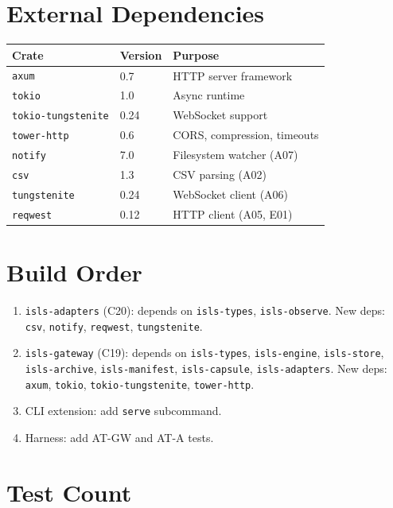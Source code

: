 \documentclass[11pt,a4paper,twoside]{article}
\theoremstyle{definition}
\theoremstyle{plain}
\theoremstyle{remark}
\begin{document}
\section{External Dependencies}

\begin{tabular}{l l l}
\toprule
\textbf{Crate} & \textbf{Version} & \textbf{Purpose} \\
\midrule
\texttt{axum} & 0.7 & HTTP server framework \\
\texttt{tokio} & 1.0 & Async runtime \\
\texttt{tokio-tungstenite} & 0.24 & WebSocket support \\
\texttt{tower-http} & 0.6 & CORS, compression, timeouts \\
\texttt{notify} & 7.0 & Filesystem watcher (A07) \\
\texttt{csv} & 1.3 & CSV parsing (A02) \\
\texttt{tungstenite} & 0.24 & WebSocket client (A06) \\
\texttt{reqwest} & 0.12 & HTTP client (A05, E01) \\
\bottomrule
\end{tabular}

\section{Build Order}

\begin{enumerate}[nosep]
  \item \texttt{isls-adapters} (C20): depends on \texttt{isls-types},
        \texttt{isls-observe}. New deps: \texttt{csv}, \texttt{notify},
        \texttt{reqwest}, \texttt{tungstenite}.
  \item \texttt{isls-gateway} (C19): depends on \texttt{isls-types},
        \texttt{isls-engine}, \texttt{isls-store},
        \texttt{isls-archive}, \texttt{isls-manifest},
        \texttt{isls-capsule}, \texttt{isls-adapters}. New deps:
        \texttt{axum}, \texttt{tokio}, \texttt{tokio-tungstenite},
        \texttt{tower-http}.
  \item CLI extension: add \texttt{serve} subcommand.
  \item Harness: add AT-GW and AT-A tests.
\end{enumerate}

\section{Test Count}
\end{document}
